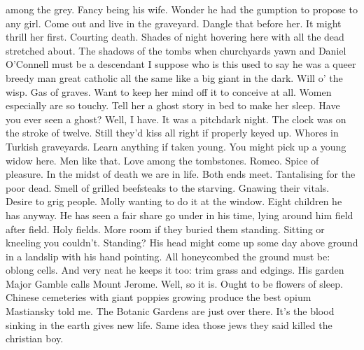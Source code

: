 \documentclass{article}
\begin{document}
among the grey. Fancy being his wife. Wonder he had the gumption to
propose to any girl. Come out and live in the graveyard. Dangle that
before her. It might thrill her first. Courting death. Shades of night
hovering here with all the dead stretched about. The shadows of the
tombs when churchyards yawn and Daniel O’Connell must be a descendant
I suppose who is this used to say he was a queer breedy man great
catholic all the same like a big giant in the dark. Will o’ the wisp.
Gas of graves. Want to keep her mind off it to conceive at all. Women
especially are so touchy. Tell her a ghost story in bed to make her
sleep. Have you ever seen a ghost? Well, I have. It was a pitchdark
night. The clock was on the stroke of twelve. Still they’d kiss all
right if properly keyed up. Whores in Turkish graveyards. Learn anything
if taken young. You might pick up a young widow here. Men like that.
Love among the tombstones. Romeo. Spice of pleasure. In the midst of
death we are in life. Both ends meet. Tantalising for the poor dead.
Smell of grilled beefsteaks to the starving. Gnawing their vitals.
Desire to grig people. Molly wanting to do it at the window. Eight
children he has anyway.
He has seen a fair share go under in his time, lying around him field
after field. Holy fields. More room if they buried them standing.
Sitting or kneeling you couldn’t. Standing? His head might come
up some day above ground in a landslip with his hand pointing. All
honeycombed the ground must be: oblong cells. And very neat he keeps it
too: trim grass and edgings. His garden Major Gamble calls Mount Jerome.
Well, so it is. Ought to be flowers of sleep. Chinese cemeteries with
giant poppies growing produce the best opium Mastiansky told me. The
Botanic Gardens are just over there. It’s the blood sinking in
the earth gives new life. Same idea those jews they said killed
the christian boy.
\end{document}
